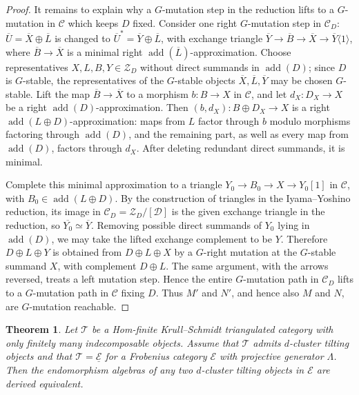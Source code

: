 \documentclass[12pt]{article}
\theoremstyle{plain}
\newtheorem{Theo}[Def]{Theorem}
\theoremstyle{definition}
\DeclareMathOperator{\add}{add}
\begin{document}
\begin{proof}
It remains to explain why a \(G\)-mutation step in the reduction lifts to a
\(G\)-mutation in \(\mathcal C\) which keeps \(D\) fixed.  Consider one right
\(G\)-mutation step in \(\mathcal C_D\):
\(\overline U=\overline X\oplus \overline L\) is changed to
\(\overline U^*=\overline Y\oplus \overline L\), with exchange triangle
\(\overline Y\to \overline B\to \overline X\to
\overline Y\langle1\rangle\), where \(\overline B\to\overline X\) is a
minimal right \(\add(\overline L)\)-approximation.  Choose representatives
\(X,L,B,Y\in\mathcal Z_D\) without direct summands in \(\add(D)\); since \(D\)
is \(G\)-stable, the representatives of the \(G\)-stable objects
\(\overline X,\overline L,\overline Y\) may be chosen \(G\)-stable.  Lift the
map \(\overline B\to\overline X\) to a morphism \(b:B\to X\) in
\(\mathcal C\), and let \(d_X:D_X\to X\) be a right \(\add(D)\)-approximation.
Then
\((b,d_X):B\oplus D_X\to X\)
is a right \(\add(L\oplus D)\)-approximation: maps from \(L\) factor through
\(b\) modulo morphisms factoring through \(\add(D)\), and the remaining part,
as well as every map from \(\add(D)\), factors through \(d_X\).  After deleting
redundant direct summands, it is minimal.

Complete this minimal approximation to a triangle
\(Y_0\to B_0\to X\to Y_0[1]\) in \(\mathcal C\), with
\(B_0\in\add(L\oplus D)\).  By the construction of triangles in the
Iyama--Yoshino reduction, its image in
\(\mathcal C_D=\mathcal Z_D/[\mathcal D]\) is the given exchange triangle in
the reduction, so \(\overline{Y_0}\simeq\overline Y\).
Removing possible direct summands of \(Y_0\) lying in \(\add(D)\), we may take
the lifted exchange complement to be \(Y\).  Therefore
\(D\oplus L\oplus Y\) is obtained from \(D\oplus L\oplus X\) by a
\(G\)-right mutation at the \(G\)-stable summand \(X\), with complement
\(D\oplus L\).  The same argument, with the arrows reversed, treats a
left mutation step.  Hence the entire \(G\)-mutation path in
\(\mathcal C_D\) lifts to a \(G\)-mutation path in \(\mathcal C\) fixing
\(D\).  Thus \(M'\) and \(N'\), and hence also \(M\) and \(N\), are
\(G\)-mutation reachable.
\end{proof}

\begin{Theo}\label{theo-equivariant-mutation-connected}
Let \(\mathcal T\) be a Hom-finite Krull--Schmidt triangulated category
with only finitely many indecomposable objects.  Assume that \(\mathcal T\)
admits \(d\)-cluster tilting objects and that
\(\mathcal T=\underline{\mathcal E}\) for a Frobenius category \(\mathcal E\)
with projective generator \(\Lambda\).  Then the endomorphism algebras of any
two \(d\)-cluster tilting objects in \(\mathcal E\) are derived equivalent.
\end{Theo}
\end{document}
